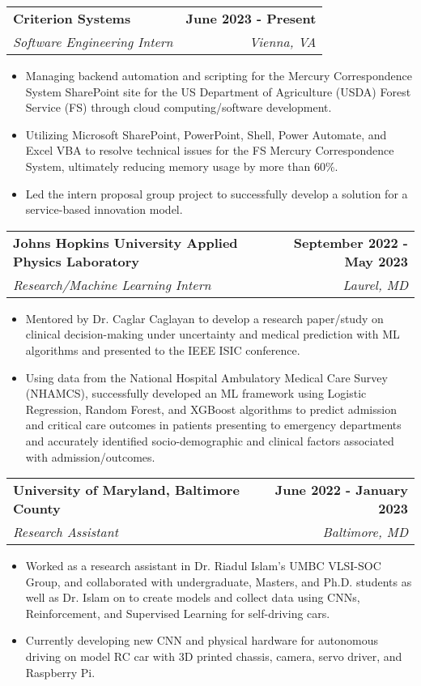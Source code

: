 \documentclass[letterpaper,11pt]{article}
\makeatletter
\newcommand{\resumeItem}[1]{
  \item\small{
    {#1 \vspace{-2pt}}
  }
}
\newcommand{\resumeSubheading}[4]{
  \vspace{-2pt}\item
    \begin{tabular*}{1.0\textwidth}[t]{l@{\extracolsep{\fill}}r}
      \textbf{#1} & \textbf{\small #2} \\
      \textit{\small#3} & \textit{\small #4} \\
    \end{tabular*}\vspace{-7pt}
}
\newcommand{\resumeItemListStart}{\begin{itemize}}
\newcommand{\resumeItemListEnd}{\end{itemize}\vspace{-5pt}}
\makeatother
\begin{document}
    \resumeSubheading
        {Criterion Systems}{June 2023 - Present} 
        {Software Engineering Intern}{Vienna, VA}
    \resumeItemListStart
        \resumeItem{Managing backend automation and scripting for the Mercury Correspondence System SharePoint site for the US Department of Agriculture (USDA) Forest Service (FS) through cloud computing/software development.}
        \resumeItem{Utilizing Microsoft SharePoint, PowerPoint, Shell, Power Automate, and Excel VBA to resolve technical issues for the FS Mercury Correspondence System, ultimately reducing memory usage by more than 60\%.}
        \resumeItem{Led the intern proposal group project to successfully develop a solution for a service-based innovation model.}
                              \resumeItemListEnd
          \vspace{-2pt}

    \resumeSubheading
        {Johns Hopkins University Applied Physics Laboratory}{September 2022 - May 2023} 
        {Research/Machine Learning Intern}{Laurel, MD}
      \resumeItemListStart
        \resumeItem{Mentored by Dr. Caglar Caglayan to develop a research paper/study on clinical decision-making under uncertainty and medical prediction with ML algorithms and presented to the IEEE ISIC conference.}
        \resumeItem{Using data from the National Hospital Ambulatory Medical Care Survey (NHAMCS), successfully developed an ML framework using Logistic Regression, Random Forest, and XGBoost algorithms to predict admission and critical care outcomes in patients presenting to emergency departments and accurately identified socio-demographic and clinical factors associated with admission/outcomes.}
                                    \resumeItemListEnd
          \vspace{-2pt}

    \resumeSubheading
        {University of Maryland, Baltimore County}{June 2022 - January 2023} 
        {Research Assistant}{Baltimore, MD}
      \resumeItemListStart
        \resumeItem{Worked as a research assistant in Dr. Riadul Islam's UMBC VLSI-SOC Group, and collaborated with undergraduate, Masters, and Ph.D. students as well as Dr. Islam on to create models and collect data using CNNs, Reinforcement, and Supervised Learning for self-driving cars.}
        \resumeItem{Currently developing new CNN and physical hardware for autonomous driving on model RC car with 3D printed chassis, camera, servo driver, and Raspberry Pi.}
                                    \resumeItemListEnd

    
  
\end{document}
